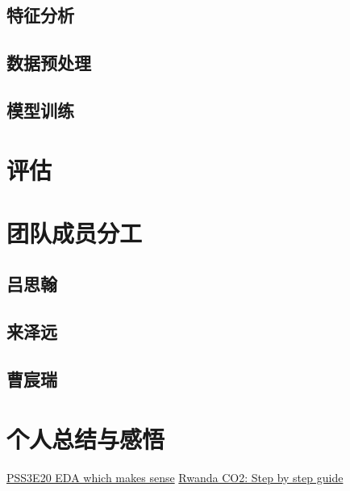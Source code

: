 \documentclass[fontset=windows]{article}
\begin{document}
\subsection{特征分析}
\subsection{数据预处理}
\subsection{模型训练}

\section{评估}
\section{团队成员分工}

\subsection{吕思翰}

\subsection{来泽远}

\subsection{曹宸瑞}

\section{个人总结与感悟}

\begin{thebibliography}{100}  
\href{https://www.kaggle.com/code/ambrosm/pss3e20-eda-which-makes-sense}{PSS3E20 EDA which makes sense}
\href{https://www.kaggle.com/code/kacperrabczewski/rwanda-co2-step-by-step-guide}{Rwanda CO2: Step by step guide}
\end{thebibliography}
\end{document}
